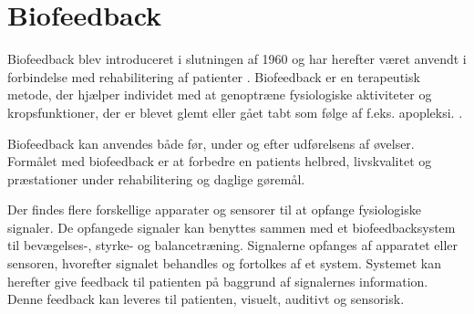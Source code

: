 \section{Biofeedback}
Biofeedback blev introduceret i slutningen af 1960 og har herefter været anvendt i forbindelse med rehabilitering af patienter \cite{Glanz1995, Prentice2007}. Biofeedback er en terapeutisk metode, der hjælper individet med at genoptræne fysiologiske aktiviteter og kropsfunktioner, der er blevet glemt eller gået tabt som følge af f.eks. apopleksi. \cite{Prentice2007}. 

Biofeedback kan anvendes både før, under og efter udførelsens af øvelser. \cite{Giggins2013, Prentice2007}Formålet med biofeedback er at forbedre en patients helbred, livskvalitet og præstationer under rehabilitering og daglige gøremål.


Der findes flere forskellige apparater og sensorer til at opfange fysiologiske signaler. De opfangede signaler kan benyttes sammen med et biofeedbacksystem til bevægelses-, styrke- og balancetræning. Signalerne opfanges af apparatet eller sensoren, hvorefter signalet behandles og fortolkes af et system.  Systemet kan herefter give feedback til patienten på baggrund af signalernes information. \cite{Prentice2007} Denne feedback kan leveres til patienten, visuelt, auditivt og sensorisk.


